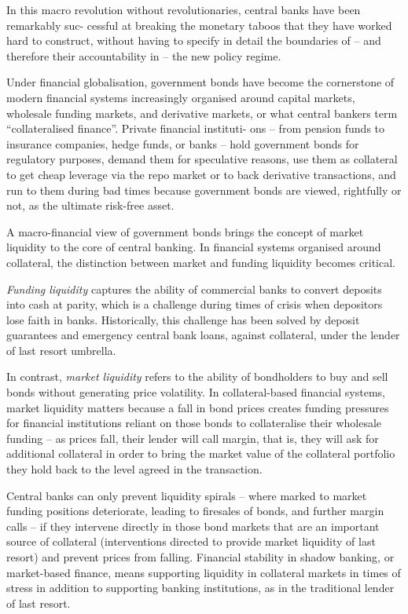 \documentclass[
]{book}
\begin{document}
In this macro revolution without revolutionaries, central banks have been remarkably suc-
cessful at breaking the monetary taboos that they have worked hard to construct, without
having to specify in detail the boundaries of -- and therefore their accountability in --
the new policy regime.

Under financial globalisation,
government bonds have become the cornerstone of modern financial systems
increasingly organised around capital markets, wholesale funding markets,
and derivative markets, or what central bankers term ``collateralised finance''.
Private financial instituti-
ons -- from pension funds to insurance companies, hedge funds, or banks -- hold government
bonds for regulatory purposes, demand them for speculative reasons, use them as collateral
to get cheap leverage via the repo market or to back derivative transactions, and run to them
during bad times because government bonds are viewed, rightfully or not, as the ultimate
risk-free asset.

A macro-financial view of government bonds brings the concept of market liquidity to the
core of central banking. In financial systems organised around collateral,
the distinction between market and funding liquidity becomes critical.

\emph{Funding liquidity} captures the ability of commercial banks to convert deposits into cash
at parity, which is a challenge during times of crisis when depositors lose faith in banks.
Historically, this challenge has been solved by deposit guarantees and emergency central bank
loans, against collateral, under the lender of last resort umbrella.

In contrast, \emph{market liquidity} refers to the ability of bondholders to
buy and sell bonds without generating price volatility.
In collateral-based financial systems, market liquidity matters because a fall in bond prices
creates funding pressures for financial institutions reliant on those bonds to collateralise
their wholesale funding -- as prices fall, their lender will call margin, that is,
they will ask for additional collateral in order to bring the market value of the collateral
portfolio they hold back to the level agreed in the transaction.

Central banks can only prevent liquidity spirals -- where marked to market
funding positions deteriorate, leading to firesales of bonds, and further margin calls --
if they intervene directly in those bond markets that are an important source of collateral
(interventions directed to provide market liquidity of last resort)
and prevent prices from falling.
Financial stability in shadow banking, or market-based finance, means supporting liquidity in
collateral markets in times of stress in addition to supporting banking institutions,
as in the traditional lender of last resort.
\end{document}
